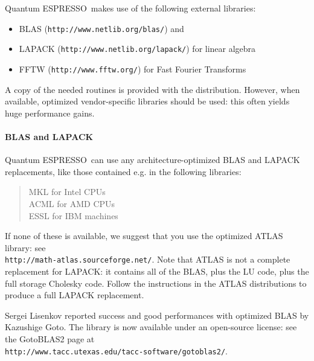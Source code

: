 \documentclass[12pt,a4paper]{article}
\def\qe{{\sc Quantum ESPRESSO}}
\begin{document}
\qe\ makes use of the following external libraries:
\begin{itemize}
\item BLAS (\texttt{http://www.netlib.org/blas/}) and
\item LAPACK (\texttt{http://www.netlib.org/lapack/}) for linear algebra
\item FFTW (\texttt{http://www.fftw.org/}) for Fast Fourier Transforms
\end{itemize}
A copy of the needed routines is provided with the distribution. However,
when available, optimized vendor-specific libraries should be used: this
often yields huge performance gains.

\paragraph{BLAS and LAPACK}
\qe\ can use any architecture-optimized BLAS and LAPACK replacements,
like those contained e.g. in the following libraries:
\begin{quote}
MKL for Intel CPUs\\
ACML for AMD CPUs\\
ESSL for IBM machines\\
\end{quote}

If none of these is available, we suggest that you use the optimized ATLAS
library: see \\
\texttt{http://math-atlas.sourceforge.net/}. Note that ATLAS is not
a complete replacement for LAPACK: it contains all of the BLAS, plus the
LU code, plus the full storage Cholesky code. Follow the instructions in the
ATLAS distributions to produce a full LAPACK replacement.

Sergei Lisenkov reported success and good performances with optimized
BLAS by Kazushige Goto. The library is now available under an
open-source license: see the GotoBLAS2 page at \\
\texttt{http://www.tacc.utexas.edu/tacc-software/gotoblas2/}.
\end{document}

